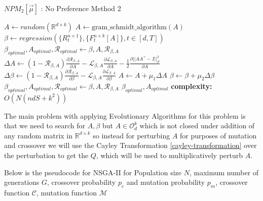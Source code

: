 \begin{algorithm}[H]
\caption{$NPM_2[\vec{\mu}]$ : No Preference Method 2}\label{no_preference_method_2}
\begin{algorithmic}[1]
\State $A \gets random(\mathbb{R}^{d\times k})$
\State $A \gets \text{gram\_schmidt\_algorithm}(A)$
\State $\beta \gets regression(\{R^{n\times 1}_{t}\},\{F^{n\times k}_{t}[A]\}, t\in [d,T])$
\State $\beta_{optimal}, A_{optimal}, \mathcal{R}_{optimal} \gets \beta, A, \mathcal{R}_{\beta, A}$
    \State $\Delta A \gets (1-\mathcal{R}_{\beta, A})\frac{\partial \mathcal{R}_{\beta, A}}{\partial A} - \mathcal{L}_{\beta, A} \frac{\partial \mathcal{L}_{\beta, A}}{\partial A}- \frac{1}{2}\frac{\partial ||AA^\top -I||^2_F}{\partial A} $
    \State $\Delta \beta \gets (1-\mathcal{R}_{\beta, A})\frac{\partial \mathcal{R}_{\beta, A}}{\partial \beta} - \mathcal{L}_{\beta, A} \frac{\partial \mathcal{L}_{\beta, A}}{\partial \beta} $
    \State $A \gets A + \mu_1 \Delta A$
    \State $\beta \gets \beta + \mu_2 \Delta \beta$
      
        \State $\beta_{optimal}, A_{optimal}, \mathcal{R}_{optimal} \gets \beta, A, \mathcal{R}_{\beta, A} $
    \EndIf 
\EndFor
\State \Return  $\beta_{optimal}, A_{optimal}$
\State \textbf{complexity: } $O(N(ndS+k^2))$
\end{algorithmic}
\end{algorithm}


The main problem with applying Evolutionary Algorithms for this problem is that we need to search for $A,\beta$ but $A \in \mathcal{O}^{k}_{d}$ which is not closed under addition of any random matrix in $\mathbb{R}^{d\times k}$ so instead for perturbing $A$ for purposes of mutation and crossover we will use the Cayley Transformation \ref{cayley-transformation} over the perturbation to get the $Q$, which will be used to multiplicatively perturb $A$.

 Below is the pseudocode for NSGA-II for Population size $N$, maximum number of generations $G$, crossover probability $p_c$ and mutation probability $p_m$, crossover function $\mathcal{C}$, mutation function $\mathcal{M}$

